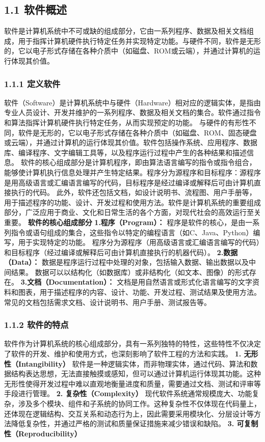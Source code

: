 \subsection{1.1 软件概述}\label{ux8f6fux4ef6ux6982ux8ff0} 软件是计算机系统中不可或缺的组成部分，它由一系列程序、数据及相关文档组成，用于指挥计算机硬件执行特定任务并实现特定功能。与硬件不同，软件是无形的，它以电子形式存储在各种介质中（如磁盘、ROM或云端），并通过计算机的运行体现其价值。 \subsubsection{1.1.1 定义软件}\label{ux5b9aux4e49ux8f6fux4ef6} 软件（Software）是计算机系统中与硬件（Hardware）相对应的逻辑实体，是指由专业人员设计、开发并维护的一系列程序、数据及相关文档的集合。软件通过指令和算法指挥计算机硬件执行特定任务，从而实现预定的功能。 与硬件的有形性不同，软件是无形的，它以电子形式存储在各种介质中（如磁盘、ROM、固态硬盘或云端），并通过计算机的运行体现其价值。软件包括操作系统、应用程序、数据库、编译程序、文字编辑工具等，以及程序运行过程中产生的各种结果和描述信息。 软件的核心组成部分是计算机程序，即由算法语言编写的指令或指令组合，能够使计算机执行信息处理并产生特定结果。程序分为源程序和目标程序：源程序是用高级语言或汇编语言编写的代码，目标程序是经过编译或解释后可由计算机直接执行的代码。 此外，软件还包括文档，如设计说明书、流程图、用户手册等，用于描述程序的功能、设计、开发过程和使用方法。软件是计算机系统的重要组成部分，广泛应用于商业、文化和日常生活的各个方面，对现代社会的高效运行至关重要。 \textbf{软件的核心组成部分} \textbf{1.程序（Program）：} 程序是软件的核心，是由一系列指令或语句组成的集合，这些指令以特定的编程语言（如C、Java、Python）编写，用于实现特定的功能。 程序分为源程序（用高级语言或汇编语言编写的代码）和目标程序（经过编译或解释后可由计算机直接执行的机器代码）。 \textbf{2.数据（Data）：} 数据是程序运行过程中处理的对象，包括输入数据、输出数据以及中间结果。 数据可以以结构化（如数据库）或非结构化（如文本、图像）的形式存在。 \textbf{3.文档（Documentation）：} 文档是用自然语言或形式化语言编写的文字资料和图表，用于描述程序的内容、设计、功能、开发过程、测试结果及使用方法。 常见的文档包括需求文档、设计说明书、用户手册、测试报告等。 \subsubsection{1.1.2 软件的特点}\label{ux8f6fux4ef6ux7684ux7279ux70b9} 软件作为计算机系统的核心组成部分，具有一系列独特的特性，这些特性不仅决定了软件的开发、维护和使用方式，也深刻影响了软件工程的方法和实践。 \textbf{1. 无形性（Intangibility）} 软件是一种逻辑实体，而非物理实体，通过代码、算法和数据结构表达思想，无法直接触摸或感知，但可以通过计算机运行体现其功能。这种无形性使得开发过程中难以直观地衡量进度和质量，需要通过文档、测试和评审等手段进行管理。 \textbf{2. 复杂性（Complexity）} 现代软件系统通常规模庞大、功能复杂，涉及多个模块、组件和子系统的协同工作。这种复杂性不仅体现在代码量上，还体现在逻辑结构、交互关系和动态行为上，因此需要采用模块化、分层设计等方法降低复杂性，并通过严格的测试和质量保证措施来减少错误和缺陷。 \textbf{3. 可复制性（Reproducibility）} 